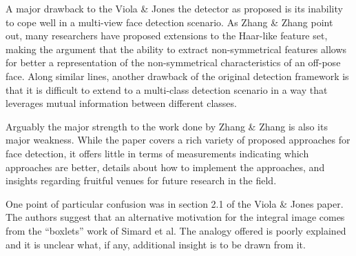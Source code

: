 \documentclass[12pt]{article}
\begin{document}
\par
A major drawback to the Viola \& Jones the detector as proposed is its inability to cope well in a multi-view face detection scenario. As Zhang \& Zhang point out, many researchers have proposed extensions to the Haar-like feature set, making the argument that the ability to extract non-symmetrical features allows for better a representation of the non-symmetrical characteristics of an off-pose face. Along similar lines, another drawback of the original detection framework is that it is difficult to extend to a multi-class detection scenario in a way that leverages mutual information between different classes.
\par
Arguably the major strength to the work done by Zhang \& Zhang is also its major weakness. While the paper covers a rich variety of proposed approaches for face detection, it offers little in terms of measurements indicating which approaches are better, details about how to implement the approaches, and insights regarding fruitful venues for future research in the field.
\par
One point of particular confusion was in section 2.1 of the Viola \& Jones paper.
The authors suggest that an alternative motivation for the integral image comes from the ``boxlets'' work of Simard et al.
The analogy offered is poorly explained and it is unclear what, if any, additional insight is to be drawn from it.

 
\end{document}
